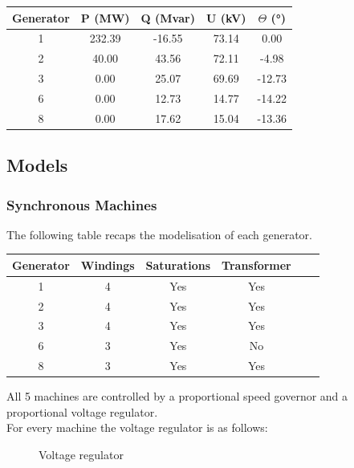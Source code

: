 \documentclass[a4paper, 12pt]{report}
\begin{document}
\begin{center}
\begin{tabular}{|c|c|c|c|c|}
  \hline
  Generator & P (MW) & Q (Mvar) & U (kV) & $\Theta$ (°) \\
  \hline
  1 & 232.39 & -16.55 & 73.14 & 0.00\\
  2 & 40.00 & 43.56 & 72.11 & -4.98\\
  3 & 0.00 & 25.07 & 69.69 & -12.73\\
  6 & 0.00 & 12.73 & 14.77 & -14.22\\
  8 & 0.00 & 17.62 & 15.04 & -13.36\\
  \hline
\end{tabular}
\end{center}

\subsection{Models}

\subsubsection{Synchronous Machines}

The following table recaps the modelisation of each generator.

\begin{center}
\begin{tabular}{|c|c|c|c|c|c|}
  \hline
  Generator & Windings  & Saturations & Transformer\\
  \hline
  1 & 4 & Yes & Yes\\
  2 & 4 & Yes & Yes\\
  3 & 4 & Yes & Yes\\
  6 & 3 & Yes & No\\
  8 & 3 & Yes & Yes\\
  \hline
\end{tabular}
\end{center}

All 5 machines are controlled by a proportional speed governor and a proportional voltage regulator. \\

For every machine the voltage regulator is as follows:
\begin{figure}[H]
\centering
{}
\caption{Voltage regulator}
\end{figure}
\end{document}
